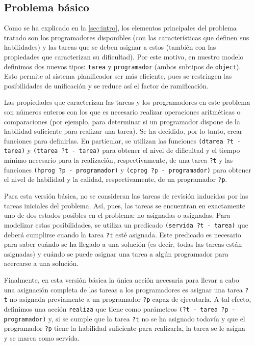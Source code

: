 
\subsection{Problema básico} \label{sec:mod-basico}

Como se ha explicado en la \autoref{sec:intro}, los elementos principales del 
problema tratado son los programadores disponibles (con las características 
que definen sus habilidades) y las tareas que se deben asignar a estos 
(también con las propiedades que caracterizan su dificultad). Por este 
motivo, en nuestro modelo definimos dos nuevos tipos: \texttt{tarea} y 
\texttt{programador} (ambos subtipos de \texttt{object}). Esto permite al 
sistema planificador ser más eficiente, pues se restringen las posibilidades 
de unificación y se reduce así el factor de ramificación.

Las propiedades que caracterizan las tareas y los programadores en este 
problema son números enteros con los que es necesario realizar operaciones 
aritméticas o comparaciones (por ejemplo, para determinar si un programador 
dispone de la habilidad suficiente para realizar una tarea). Se ha decidido, 
por lo tanto, crear funciones para definirlas. En particular, se utilizan las 
funciones \texttt{(dtarea ?t - tarea)} y \texttt{(ttarea ?t - tarea)} para 
obtener el nivel de dificultad y el tiempo mínimo necesario para la 
realización, respectivamente, de una tarea \texttt{?t} y las funciones 
\texttt{(hprog ?p - programador)} y \texttt{(cprog ?p - programador)} para 
obtener el nivel de habilidad y la calidad, respectivamente, de un programador 
\texttt{?p}. 

Para esta versión básica, no se consideran las tareas de revisión inducidas 
por las tareas iniciales del problema. Así, pues, las tareas se encuentran en 
exactamente uno de dos estados posibles en el problema: no asignadas o 
asignadas. Para modelizar estas posibilidades, se utiliza un predicado 
\texttt{(servida ?t - tarea)} que deberá cumplirse cuando la tarea \texttt{?t} 
esté asignada. Este predicado es necesario para saber cuándo se ha llegado a 
una solución (es decir, todas las tareas están asignadas) y cuándo se puede 
asignar una tarea a algún programador para acercarse a una solución.

Finalmente, en esta versión básica la única acción necesaria para llevar a 
cabo una asignación completa de las tareas a los programadores es asignar una 
tarea \texttt{?t} no asignada previamente a un programador \texttt{?p} capaz 
de ejecutarla. A tal efecto, definimos una acción \texttt{realiza} que tiene 
como parámetros \texttt{(?t - tarea ?p - programador)} y, si se cumple que la 
tarea \texttt{?t} no se ha asignado todavía y que el programador \texttt{?p} 
tiene la habilidad suficiente para realizarla, la tarea se le asigna y se 
marca como servida.

